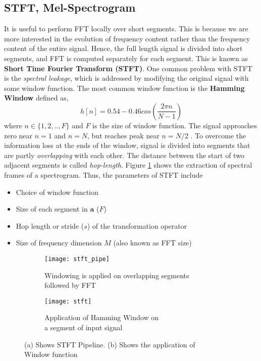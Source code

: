 \subsection{STFT, Mel-Spectrogram}
\label{stft}
It is useful to perform FFT locally over short segments. This is because we are more interested in the evolution of frequency content rather than the frequency content of the entire signal. Hence, the full length signal is divided into short segments, and FFT is computed separately for each segment. This is known as \textbf{Short Time Fourier Transform (STFT)}. One common problem with STFT is the \textit{spectral leakage}, which is addressed by modifying the original signal with some window function. The most common window function is the \textbf{Hamming Window} defined as,
\begin{equation}
h[n] = 0.54 - 0.46cos(\frac{2 \pi n}{N-1})
\end{equation}
where $n \in \{1,2,..,F\}$ and $F$ is the size of window function. The signal approaches zero near $n=1$ and $n=N$, but reaches peak near $n=N/2$ \cite{specLeak}. To overcome the information loss at the ends of the window, signal is divided into segments that are partly \textit{overlapping} with each other. The distance between the start of two adjacent segments is called \textit{hop-length}. Figure \ref{fig:stftPipe} shows the extraction of spectral frames of a spectrogram. Thus, the parameters of STFT include 
\begin{itemize}
    \setlength\itemsep{0em}
    \item Choice of window function
    \item Size of each segment in $\textbf{a}$ ($F$)
    \item Hop length or stride ($s$) of the transformation operator
    \item Size of frequency dimension $M$ (also known as FFT size)
\end{itemize}

\begin{figure}[h]
       \begin{subfigure}[b]{0.6\textwidth}
        \texttt{[image: stft\_pipe]}
        \caption{Windowing is applied on overlapping segments\\ followed by FFT }
        \label{fig:stftPipe}
       \end{subfigure}
	    \begin{subfigure}[b]{0.4\textwidth}
        \texttt{[image: stft]}
        \caption{
        Application of Hamming Window on \\a segment of input signal
        }
        \label{fig:HammingWindow}
       \end{subfigure}
       \caption{\cite{spec_dia} (a) Shows STFT Pipeline. (b) Shows the application of \\Window function}\label{fig:STFT}
\end{figure}
\FloatBarrier

